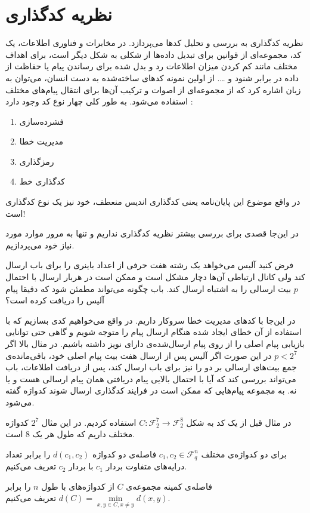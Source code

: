\section{نظریه کدگذاری}
نظریه کدگذاری به بررسی و تحلیل کد‌ها می‌پردازد. در مخابرات و فناوری اطلاعات، یک کد، مجموعه‌‌ای از قوانین برای تبدیل داده‌ها از شکلی به شکل دیگر است، برای اهداف مختلف مانند کم‌ کردن میزان اطلاعات رد و بدل‌‌ شده برای رساندن پیام یا حفاظت از داده در برابر شنود و \dots .
از اولین نمونه‌ کدهای ساخته‌شده به دست انسان، می‌توان به زبان اشاره کرد که از مجموعه‌ای از اصوات و ترکیب آن‌ها برای انتقال پیام‌های مختلف استفاده می‌شود. به طور کلی چهار نوع کد وجود دارد \cite{wiki:coding1, wiki:coding2}:
\begin{enumerate}
	\item فشرده‌سازی
	\item مدیریت خطا
	\item رمزگذاری
	\item کدگذاری خط
\end{enumerate}

در واقع موضوع این پایان‌نامه یعنی کدگذاری اندیس منعطف، خود نیز یک نوع کدگذاری است!

در این‌جا قصدی برای بررسی بیشتر نظریه کدگذاری نداریم و تنها به مرور موارد مورد نیاز خود می‌پردازیم.
\begin{example}
	فرض کنید آلیس می‌خواهد یک رشته هفت حرفی از اعداد باینری را برای باب ارسال کند ولی کانال ارتباطی آن‌ها دچار مشکل است و ممکن است در هربار ارسال با احتمال
	$p$
	بیت ارسالی را به اشتباه ارسال کند. باب چگونه می‌تواند مطمئن شود که دقیقا پیام آلیس را دریافت کرده است؟
	
	در این‌جا با کدهای مدیریت خطا سروکار داریم. در واقع می‌خواهیم کدی بسازیم که با استفاده از آن خطای ایجاد شده هنگام ارسال پیام را متوجه شویم و گاهی حتی توانایی بازیابی پیام اصلی را از روی پیام ارسال‌شده‌ی دارای نویز داشته باشیم. در مثال بالا اگر
	$p < 2^7$
	در این صورت اگر آلیس پس از ارسال هفت بیت پیام اصلی خود، باقی‌مانده‌ی جمع بیت‌های ارسالی بر دو را نیز برای باب ارسال کند، پس از دریافت اطلاعات، باب می‌تواند بررسی کند که آیا با احتمال بالایی پیام دریافتی همان پیام ارسالی هست و یا نه. به مجموعه‌ پیام‌هایی که ممکن است در فرایند کدگذاری ارسال شوند کدواژه گفته می‌شود.
	
	در مثال قبل از یک کد به شکل
	$C: \mathcal{F}_2^7 \rightarrow \mathcal{F}_2^8$
	استفاده کردیم. در این مثال
	$2^7$
	کدواژه مختلف داریم که طول هر یک
	$8$
	است.
\end{example}

\begin{definition}
	برای دو کدواژه‌ی مختلف
	$c_1, c_2 \in \mathcal{F}_q^n$
	فاصله‌ی دو کدواژه
	$d(c_1, c_2)$
	را برابر تعداد درایه‌های متفاوت بردار
	$c_1$
	با بردار
	$c_2$
	تعریف می‌کنیم.
	
	 فاصله‌‌ی کمینه مجموعه‌ی
	$C$
	از کدواژه‌های با طول
	$n$
	 را برابر
	$d(C) = \min\limits_{x, y \in C, x \ne y} d(x, y)$
	تعریف می‌کنیم.
\end{definition}

